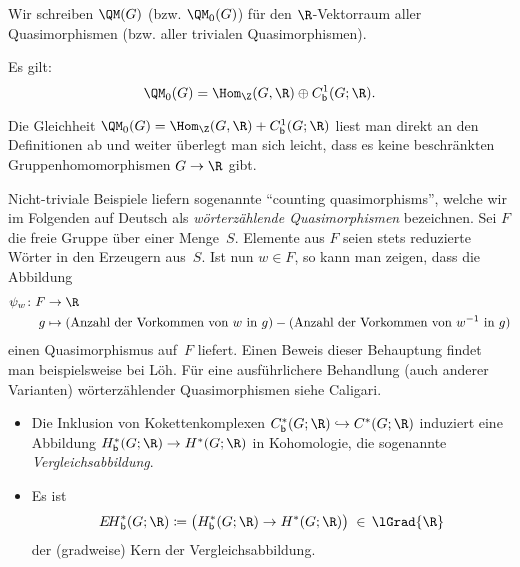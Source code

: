 \begin{thDef}
    Wir schreiben $\QM(G)$ (bzw. $\QM_0(G)$) für den $\R$-Vektorraum aller
    Quasimorphismen (bzw. aller trivialen Quasimorphismen). 
\end{thDef}

\begin{thProposition}
    \label{qmor:decompQM0}%
    Es gilt:
    \[ \QM_0(G) = \Hom_\Z(G,\R) \oplus \Cb^1(G;\R)  . \]
\end{thProposition}

\begin{proofsketch}
    Die Gleichheit $\QM_0(G) = \Hom_\Z(G,\R) + \Cb^1(G;\R)$ liest man direkt an den
    Definitionen ab und weiter überlegt man sich leicht, dass es keine beschränkten
    Gruppenhomomorphismen $G\to\R$ gibt.
    \\
\end{proofsketch}

\begin{thBeispiel}
    Nicht-triviale Beispiele liefern sogenannte \enquote{counting
    quasimorphisms}, welche wir im Folgenden auf Deutsch als
    \emph{wörterzählende Quasimorphismen} bezeichnen. Sei $F$ die freie Gruppe
    über einer Menge~$S$. Elemente aus $F$ seien stets reduzierte Wörter in den
    Erzeugern aus~$S$. Ist nun $w\in F$, so kann man zeigen, dass die Abbildung
    \begin{align*}
        \psi_w\colon F &\to \R  \\
        g &\mapsto (\text{Anzahl der Vorkommen von $w$ in $g$})
                 - (\text{Anzahl der Vorkommen von $w^{-1}$ in $g$})
    \end{align*}
    einen Quasimorphismus auf~$F$ liefert. Einen Beweis dieser Behauptung findet
    man beispielsweise bei
    Löh\cite[Ch.\,2,.3,\;Lemma~2.5.11]{lecnotes:loeh:bdcoho}.
    Für eine ausführlichere Behandlung (auch anderer Varianten) wörterzählender
    Quasimorphismen siehe Caligari\cite[Ch.\,2,.2]{bookc:calegari09}.
\end{thBeispiel}

\begin{thErinnerDef} \hfill
    \begin{itemize}
        \item
            Die Inklusion von Kokettenkomplexen $\Cb^\ast(G;\R) \hookrightarrow
            C^\ast(G;\R)$ induziert eine Abbildung $\Hb^\ast(G;\R) \to
            H^\ast(G;\R)$ in Kohomologie, die sogenannte
            \emph{Vergleichsabbildung}.
        \item
            Es ist
            \[ \EHb^\ast(G;\R)
                \defeq \ker\bigl( \Hb^\ast(G;\R) \to H^\ast(G;\R) \bigr)
                \;\in\, \lGrad{\R}
            \]
            der (gradweise) Kern der Vergleichsabbildung.
    \end{itemize}
\end{thErinnerDef}

